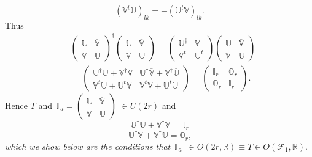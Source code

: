 \documentclass[aps, preprint]{revtex4}
\begin{document}
\begin{equation}\left (\mathbb{V}^{t} \mathbb{U}\right )_{l k} = -\left (\mathbb{U}^{t} \mathbb{V}\right )_{l k}\text{.}
\end{equation}Thus
\begin{align} & \left (\begin{array}{cc}\mathbb{U} & \overline{\mathbb{V}} \\
\mathbb{V} & \overline{\mathbb{U}}\end{array}\right )^{ \dag } \left (\begin{array}{cc}\mathbb{U} & \overline{\mathbb{V}} \\
\mathbb{V} & \overline{\mathbb{U}}\end{array}\right ) =\left (\begin{array}{cc}\mathbb{U}^{ \dag } & \mathbb{V}^{ \dag } \\
\mathbb{V}^{t} & \mathbb{U}^{t}\end{array}\right ) \left (\begin{array}{cc}\mathbb{U} & \overline{\mathbb{V}} \\
\mathbb{V} & \overline{\mathbb{U}}\end{array}\right ) \\
 &  =\left (\begin{array}{cc}\mathbb{U}^{ \dag } \mathbb{U} +\mathbb{V}^{ \dag } \mathbb{V} & \mathbb{U}^{ \dag } \overline{\mathbb{V}} +\mathbb{V}^{ \dag } \overline{\mathbb{U}} \\
\mathbb{V}^{t} \mathbb{U} +\mathbb{U}^{t} \mathbb{V} & \mathbb{V}^{t} \overline{\mathbb{V}} +\mathbb{U}^{t} \overline{\mathbb{U}}\end{array}\right ) =\left (\begin{array}{cc}\mathbb{I}_{r} & \mathbb{O}_{r} \\
\mathbb{O}_{r} & \mathbb{I}_{r}\end{array}\right )\text{.}\end{align}Hence $T$ and $\mathbb{T}_{a} =\left (\begin{array}{cc}\mathbb{U} & \overline{\mathbb{V}} \\
\mathbb{V} & \overline{\mathbb{U}}\end{array}\right )$ $ \in U \left (2 r\right )$ and
\begin{equation}\mathbb{U}^{ \dag } \mathbb{U} +\mathbb{V}^{ \dag } \mathbb{V}\, =\mathbb{I}_{r}
\end{equation}
\begin{equation}\mathbb{U}^{ \dag } \overline{\mathbb{V}} +\mathbb{V}^{ \dag } \overline{\mathbb{U}} =\mathbb{O}_{r}\text{,}
\end{equation}\emph{which we show below are the conditions that }$\mathbb{T}_{a}$\emph{\ }$ \in O \left (2 r ,\mathbb{R}\right ) \equiv T \in O \left (\mathcal{F}_{1} ,\mathbb{R}\right )\text{.}$ 
\end{document}
